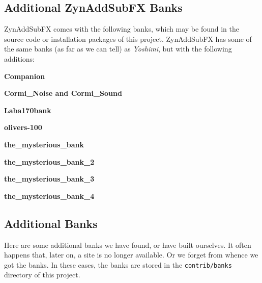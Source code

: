 \subsection{Additional ZynAddSubFX Banks}
\label{subsec:banks_collection_zynaddsubfx}

   ZynAddSubFX comes with the following banks, which may be found in
   the source code \cite{zynsource} or installation packages of this project.
   ZynAddSubFX has some of the same
   banks (as far as we can tell) as \textsl{Yoshimi}, but with the following
   additions:

   \begin{enumber}
      \item \textbf{Companion}
      \item \textbf{Cormi\_Noise and Cormi\_Sound} \cite{cormi}
      \item \textbf{Laba170bank}
      \item \textbf{olivers-100}
      \item \textbf{the\_mysterious\_bank}
      \item \textbf{the\_mysterious\_bank\_2}
      \item \textbf{the\_mysterious\_bank\_3}
      \item \textbf{the\_mysterious\_bank\_4}
   \end{enumber}

\subsection{Additional Banks}
\label{subsec:banks_collection_additional}

   Here are some additional banks we have found, or have built ourselves.
   It often happens that, later on, a site is no longer available.
   Or we forget from whence we got the banks.
   In these cases, the banks are stored in the \texttt{contrib/banks}
   directory of this project.

